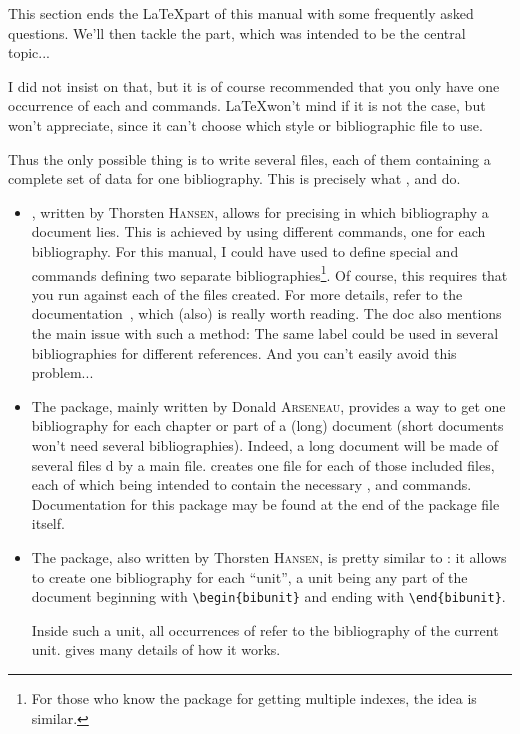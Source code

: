 
This section ends the \LaTeX part of this manual with some
frequently asked questions. We'll then tackle the \bt part, which was
intended to be the central topic...




I did not insist on that, but it is of course recommended that you
only have one occurrence of each 
 and  commands.
\LaTeX won't mind if it is not the case, but \bt won't appreciate,
since it can't choose which style or bibliographic file to use.


Thus the only possible thing is to write several  files, each
of them containing a complete set of data for one bibliography.
This is precisely what 
,  and  do. 
\begin{itemize}
\item {}, written by
Thorsten \textsc{Hansen}, 
allows for precising in which bibliography a document lies. 
This is achieved by using different  commands, one for each
bibliography. 
For this manual, I could have used  to define special
 and   commands defining two
separate bibliographies\footnote{For those who know the 
  package for getting multiple indexes, the idea is similar.}. 
Of course, this requires that you run \bt against each of the
 files created. For more details, refer to the
documentation~\cite{multibib}, which (also) is really worth
reading. The doc also mentions the main issue with such a method: The
same label could be used in several bibliographies for different
references. And you can't easily avoid this problem...

\item The  package, mainly written by 
Donald \textsc{Arseneau},  provides a way to get 
one bibliography for each
chapter or part of a (long) document (short documents won't need
several bibliographies). Indeed, a long document will be
made of several files d by a main file. 
 creates one  file for each of those included
files, each of which being intended to contain the
necessary ,  and
 commands. 
Documentation for this package may be found at the end of the package
file itself.

\item The  package, also written by 
Thorsten \textsc{Hansen}, is pretty similar to :
it allows to create one bibliography for each ``unit'', a unit
being any part of the document beginning with 
\verb+\begin{bibunit}+ and ending with
\verb+\end{bibunit}+. 


Inside such a unit, all occurrences of  refer to the
bibliography of the current unit. \cite{bibunit} gives many 
details of how it works.
\end{itemize}


